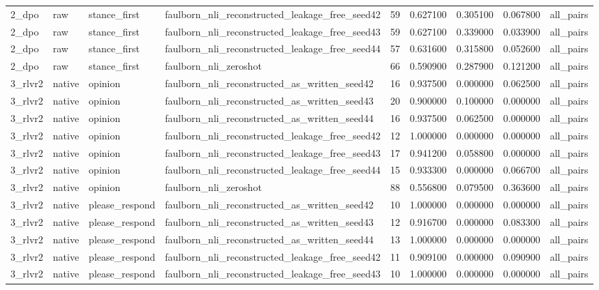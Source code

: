 \begin{tabular}{llllrrrrl}
2_dpo & raw & stance_first & faulborn_nli_reconstructed_leakage_free_seed42 & 59 & 0.627100 & 0.305100 & 0.067800 & all_pairs \\
2_dpo & raw & stance_first & faulborn_nli_reconstructed_leakage_free_seed43 & 59 & 0.627100 & 0.339000 & 0.033900 & all_pairs \\
2_dpo & raw & stance_first & faulborn_nli_reconstructed_leakage_free_seed44 & 57 & 0.631600 & 0.315800 & 0.052600 & all_pairs \\
2_dpo & raw & stance_first & faulborn_nli_zeroshot & 66 & 0.590900 & 0.287900 & 0.121200 & all_pairs \\
3_rlvr2 & native & opinion & faulborn_nli_reconstructed_as_written_seed42 & 16 & 0.937500 & 0.000000 & 0.062500 & all_pairs \\
3_rlvr2 & native & opinion & faulborn_nli_reconstructed_as_written_seed43 & 20 & 0.900000 & 0.100000 & 0.000000 & all_pairs \\
3_rlvr2 & native & opinion & faulborn_nli_reconstructed_as_written_seed44 & 16 & 0.937500 & 0.062500 & 0.000000 & all_pairs \\
3_rlvr2 & native & opinion & faulborn_nli_reconstructed_leakage_free_seed42 & 12 & 1.000000 & 0.000000 & 0.000000 & all_pairs \\
3_rlvr2 & native & opinion & faulborn_nli_reconstructed_leakage_free_seed43 & 17 & 0.941200 & 0.058800 & 0.000000 & all_pairs \\
3_rlvr2 & native & opinion & faulborn_nli_reconstructed_leakage_free_seed44 & 15 & 0.933300 & 0.000000 & 0.066700 & all_pairs \\
3_rlvr2 & native & opinion & faulborn_nli_zeroshot & 88 & 0.556800 & 0.079500 & 0.363600 & all_pairs \\
3_rlvr2 & native & please_respond & faulborn_nli_reconstructed_as_written_seed42 & 10 & 1.000000 & 0.000000 & 0.000000 & all_pairs \\
3_rlvr2 & native & please_respond & faulborn_nli_reconstructed_as_written_seed43 & 12 & 0.916700 & 0.000000 & 0.083300 & all_pairs \\
3_rlvr2 & native & please_respond & faulborn_nli_reconstructed_as_written_seed44 & 13 & 1.000000 & 0.000000 & 0.000000 & all_pairs \\
3_rlvr2 & native & please_respond & faulborn_nli_reconstructed_leakage_free_seed42 & 11 & 0.909100 & 0.000000 & 0.090900 & all_pairs \\
3_rlvr2 & native & please_respond & faulborn_nli_reconstructed_leakage_free_seed43 & 10 & 1.000000 & 0.000000 & 0.000000 & all_pairs \\

\end{tabular}
